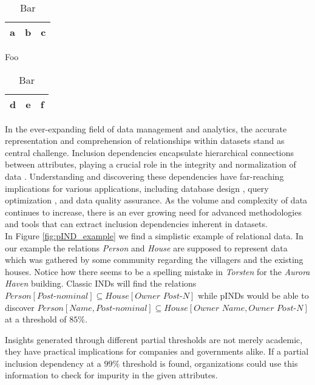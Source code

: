 \begin{table}
\parbox{.45\linewidth}{
\centering
\begin{tabular}{ccc}
\hline
a&b&c\\
\hline
\end{tabular}
\caption{Foo}
}
\hfill
\parbox{.45\linewidth}{
\centering
\begin{tabular}{ccc}
\hline
d&e&f\\
\hline
\end{tabular}
\caption{Bar}
}
\end{table}
In the ever-expanding field of data management and analytics, the accurate representation and comprehension of relationships within datasets stand as central challenge. Inclusion dependencies encapsulate hierarchical connections between attributes, playing a crucial role in the integrity and normalization of data \cite{casanova1982inclusion}. Understanding and discovering these dependencies have far-reaching implications for various applications, including database design \cite{levene2000justification}, query optimization \cite{gryz1998query}, and data quality assurance. As the volume and complexity of data continues to increase, there is an ever growing need for advanced methodologies and tools that can extract inclusion dependencies inherent in datasets. \\

In Figure \ref{fig:pIND_example} we find a simplistic example of relational data. In our example the relations \textit{Person} and \textit{House} are supposed to represent data which was gathered by some community regarding the villagers and the existing houses. Notice how there seems to be a spelling mistake in \textit{Torsten} for the \textit{Aurora Haven} building. Classic INDs will find the relations $\textit{Person}[\textit{Post-nominal}] \subseteq \textit{House}[\textit{Owner Post-N}]$ while pINDs would be able to discover $\textit{Person}[\textit{Name}, \textit{Post-nominal}] \subseteq \textit{House}[\textit{Owner Name}, \textit{Owner Post-N}]$ at a threshold of $85\%$.

Insights generated through different partial thresholds are not merely academic, they have practical implications for companies and governments alike. If a partial inclusion dependency at a $99\%$ threshold is found, organizations could use this information to check for impurity in the given attributes.